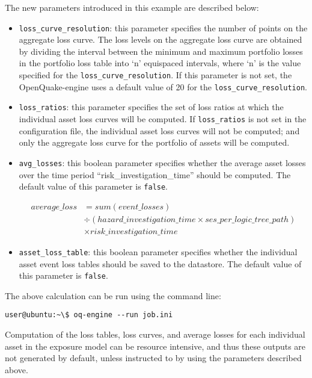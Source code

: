 The new parameters introduced in this example are described below:

\begin{itemize}

  \item \Verb+loss_curve_resolution+: this parameter specifies the number of
    points on the aggregate loss curve. The loss levels on the aggregate loss
    curve are obtained by dividing the interval between the minimum and maximum
    portfolio losses in the portfolio loss table into `n' equispaced intervals,
    where `n' is the value specified for the \Verb+loss_curve_resolution+.
    If this parameter is not set, the OpenQuake-engine uses a default value of
    20 for the \Verb+loss_curve_resolution+.

  \item \Verb+loss_ratios+: this parameter specifies the set of loss ratios at
    which the individual asset loss curves will be computed. If
    \Verb+loss_ratios+ is not set in the configuration file, the individual 
    asset loss curves will not be computed; and only the aggregate loss curve
    for the portfolio of assets will be computed.

  \item \Verb+avg_losses+: this boolean parameter specifies whether the average
    asset losses over the time period ``risk\_investigation\_time'' should be
    computed. The default value of this parameter is \Verb+false+.

    \begin{equation*}
    \begin{split}
    average\_loss & = sum(event\_losses) \\
                 & \div (hazard\_investigation\_time \times ses\_per\_logic\_tree\_path) \\
                 & \times risk\_investigation\_time
    \end{split}
    \end{equation*}

  \item \Verb+asset_loss_table+: this boolean parameter specifies whether the
    individual asset event loss tables should be saved to the datastore. 
    The default value of this parameter is \Verb+false+.

\end{itemize}

The above calculation can be run using the command line:

\begin{verbatim}
user@ubuntu:~\$ oq-engine --run job.ini
\end{verbatim}

Computation of the loss tables, loss curves, and average losses for each 
individual asset in the exposure model can be resource intensive, and thus
these outputs are not generated by default, unless instructed to by using the
parameters described above.